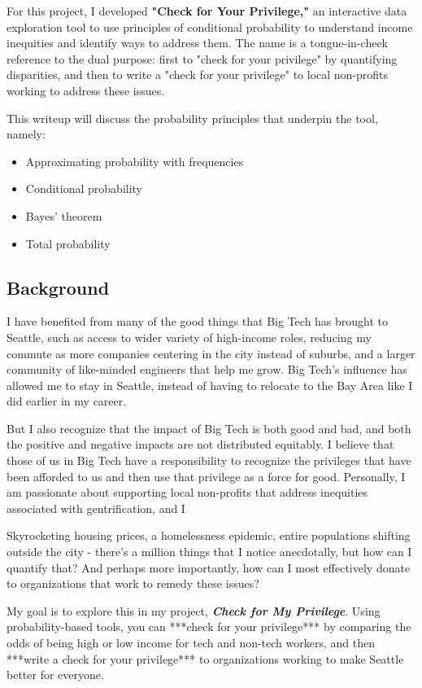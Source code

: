 \documentclass[12pt]{article}
\begin{document}
For this project, I developed \textbf{"Check for Your Privilege,"} an interactive data exploration tool to use principles of conditional probability to understand income inequities and identify ways to address them. The name is a tongue-in-cheek reference to the dual purpose: first to "check for your privilege" by quantifying disparities, and then to write a "check for your privilege" to local non-profits working to address these issues.

This writeup will discuss the probability principles that underpin the tool, namely:
\begin{itemize}
    \item Approximating probability with frequencies
    \item Conditional probability
    \item Bayes' theorem
    \item Total probability
\end{itemize}

\subsection*{Background}

I have benefited from many of the good things that Big Tech has brought to Seattle, such as access to wider variety of high-income roles, reducing my commute as more companies centering in the city instead of suburbs, and a larger community of like-minded engineers that help me grow. Big Tech's influence has allowed me to stay in Seattle, instead of having to relocate to the Bay Area like I did earlier in my career.

But I also recognize that the impact of Big Tech is both good and bad, and both the positive and negative impacts are not distributed equitably. I believe that those of us in Big Tech have a responsibility to recognize the privileges that have been afforded to us and then use that privilege as a force for good. Personally, I am passionate about supporting local non-profits that address inequities associated with gentrification, and I 

Skyrocketing housing prices, a homelessness epidemic, entire populations shifting outside the city - there's a million things that I notice anecdotally, but how can I quantify that? And perhaps more importantly, how can I most effectively donate to organizations that work to remedy these issues?

My goal is to explore this in my project, \textbf{\textit{Check for My Privilege}}. Using probability-based tools, you can ***check for your privilege*** by comparing the odds of being high or low income for tech and non-tech workers, and then ***write a check for your privilege*** to organizations working to make Seattle better for everyone.
\end{document}
